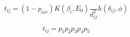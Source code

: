 \begin{equation}
  t_{ij} =  (1-p_{air})  K(\beta_{i},E_{0}) \frac{}{d^{2}_{ij}} h(\delta_{ij}, \phi)
\end{equation}


\begin{equation}
  t_{ij} =  p_{1}p_{2}p_{3}p_{4}p_{5}
\end{equation}

